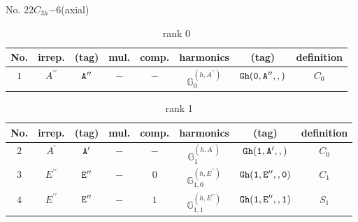 \documentclass[fleqn,8pt]{jsarticle}
\begin{document}
\setcounter{MaxMatrixCols}{16}

\begin{center}
\LARGE
No. 22\quad$C_{3h}$\quad$-6$\quad[ hexagonal ] (axial)
\end{center}
\begin{table}[ht!]
\begin{center}
\caption{rank 0}
\renewcommand{\arraystretch}{1.3}
\begin{tabular}{cccccccc} \hline \hline
No. & irrep. & (tag) & mul. & comp. & harmonics & (tag) & definition \\ \hline
$ 1 $ & $ A^{\prime\prime} $ & $ {\tt A''} $ & $ - $ & $ - $ & $ \mathbb{G}_{0}^{(h,A^{\prime\prime})} $ & $ {\tt Gh(0,A'',,)} $ & $ C_{0} $ \\
 \hline \hline
\end{tabular}
\end{center}
\end{table}
\begin{table}[ht!]
\begin{center}
\caption{rank 1}
\renewcommand{\arraystretch}{1.3}
\begin{tabular}{cccccccc} \hline \hline
No. & irrep. & (tag) & mul. & comp. & harmonics & (tag) & definition \\ \hline
$ 2 $ & $ A^{\prime} $ & $ {\tt A'} $ & $ - $ & $ - $ & $ \mathbb{G}_{1}^{(h,A^{\prime})} $ & $ {\tt Gh(1,A',,)} $ & $ C_{0} $ \\
$ 3 $ & $ E^{\prime\prime} $ & $ {\tt E''} $ & $ - $ & $ 0 $ & $ \mathbb{G}_{1,0}^{(h,E^{\prime\prime})} $ & $ {\tt Gh(1,E'',,0)} $ & $ C_{1} $ \\
$ 4 $ & $ E^{\prime\prime} $ & $ {\tt E''} $ & $ - $ & $ 1 $ & $ \mathbb{G}_{1,1}^{(h,E^{\prime\prime})} $ & $ {\tt Gh(1,E'',,1)} $ & $ S_{1} $ \\
 \hline \hline
\end{tabular}
\end{center}
\end{table}
\end{document}
